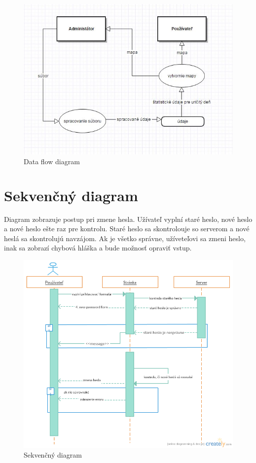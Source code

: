 \documentclass[12pt,a4paper]{report}
\begin{document}
	\begin{figure}[htb]
		\includegraphics[scale=0.5]{data_flow}
		\caption[Data flow diagram]{Data flow diagram}
		\label{fig:Data flow diagram}
	\end{figure}
\clearpage
\section[Sekvenčný diagram]{\rmfamily\bfseries
		Sekvenčný diagram}
	Diagram zobrazuje postup pri zmene hesla. Užívateľ vyplní staré heslo, nové heslo a nové heslo ešte raz pre kontrolu. Staré heslo sa skontrolouje so serverom a nové heslá sa skontrolujú navzájom. Ak je všetko správne, užíveteľovi sa zmeni heslo, inak sa zobrazí chybová hláška a bude možnosť opraviť vstup.
	
	\begin{figure}[htb]
		\includegraphics[scale=0.5]{sequence}
		\caption[Data flow diagram]{Sekvenčný diagram}
		\label{fig:Sekvenčný diagram}
	\end{figure}
\end{document}
